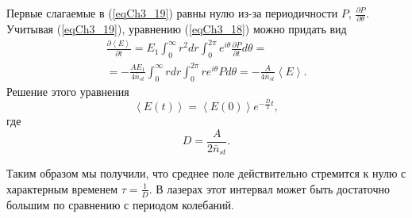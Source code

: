 Первые слагаемые в (\ref{eqCh3_19}) равны нулю из-за периодичности $P$,
$\frac{\partial P}{\partial \theta}$.  Учитывая (\ref{eqCh3_19}),
уравнению (\ref{eqCh3_18}) можно придать вид 
\begin{eqnarray}
  \frac{\partial \left<E\right>}{\partial t} =
  E_1 \int_0^{\infty}r^2 dr \int_0^{2\pi}e^{i\theta}\frac{\partial
    P}{\partial t} d \theta
  =
  \nonumber \\
  = 
- \frac{A E_1}{4 \bar{n}_{st}}
\int_0^{\infty}r dr\int_0^{2 \pi}r e^{i \theta} P d \theta = 
- \frac{A}{4 \bar{n}_{st}} \left<E\right>.
\label{eqCh3_20}
\end{eqnarray}
Решение этого уравнения 
\begin{equation}
\left<E\left(t\right)\right> = 
\left<E\left(0\right)\right> e^{- \frac{D}{2}t},
\label{eqCh3_21}
\end{equation}
где 
\begin{equation}
D = \frac{A}{2 \bar{n}_{st}}.
\label{eqCh3_21a}
\end{equation}

Таким образом мы получили, что среднее поле действительно стремится к
нулю с характерным временем $\tau = \frac{1}{D}$.  В лазерах этот
интервал может быть достаточно большим по сравнению с периодом
колебаний.

